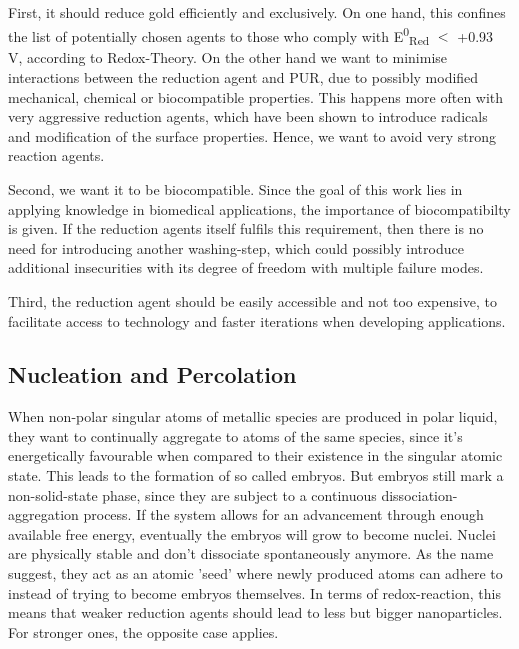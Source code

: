 First, it should reduce gold efficiently and exclusively. On one hand, this confines the list of potentially chosen agents to those who comply with E\textsuperscript{0}\textsubscript{Red} $\mathrm{<}$ +0.93 V, according to Redox-Theory. On the other hand we want to minimise interactions between the reduction agent and PUR, due to possibly modified mechanical, chemical or biocompatible properties. This happens more often with very aggressive reduction agents, which have been shown to introduce radicals and modification of the surface properties.  Hence, we want to avoid very strong reaction agents. 

Second, we want it to be biocompatible. Since the goal of this work lies in applying knowledge in biomedical applications, the importance of biocompatibilty is given. If the reduction agents itself fulfils this requirement, then there is no need for introducing another washing-step, which could possibly introduce additional insecurities with its degree of freedom with multiple failure modes. 


Third, the reduction agent should be easily accessible and not too expensive, to facilitate access to technology and faster iterations when developing applications.

\subsection{Nucleation and Percolation}
\label{subsec:Perc}

When non-polar singular atoms of metallic species are produced in polar liquid, they want to continually aggregate to atoms of the same species, since it's energetically favourable when compared to their existence in the singular atomic state. This leads to the formation of so called embryos. \cite{Goia} But embryos still mark a non-solid-state phase, since they are subject to a continuous dissociation-aggregation process. If the system allows for an advancement through enough available free energy, eventually the embryos will grow to become nuclei. Nuclei are physically stable and don't dissociate spontaneously anymore. As the name suggest, they act as an atomic 'seed' where newly produced atoms can adhere to instead of trying to become embryos themselves. In terms of redox-reaction, this means that weaker reduction agents should lead to less but bigger nanoparticles. For stronger ones, the opposite case applies. \cite{LaMer}

